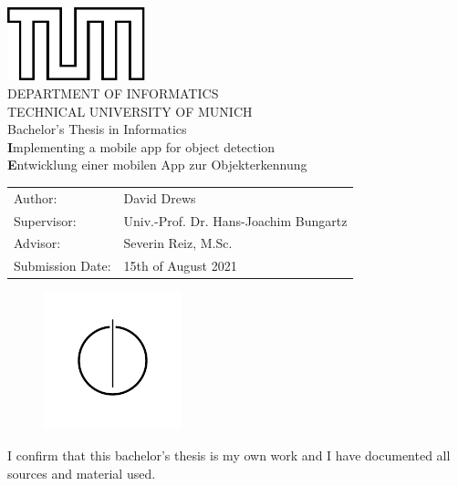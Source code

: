 \documentclass[
			   fontsize=11pt,
               paper=a4,
               bibliography=totoc,
               idxtotoc,
               headsepline,
               footsepline,
               footinclude=false,
               BCOR=12mm,
               DIV=13,
               openany,   %
               ]
               {scrbook}
\def\doctype{Bachelor's Thesis\xspace}
\def\studyProgram{Informatics}
\def\title{Implementing a mobile app for object detection}
\def\titleGer{Entwicklung einer mobilen App zur Objekterkennung}
\def\author{David Drews}
\def\supervisor{Univ.-Prof. Dr. Hans-Joachim Bungartz}
\def\advisor{Severin Reiz, M.Sc.}
\def\date{15th of August 2021}
\begin{document}
\def\bcorcor{0.15cm}
\addtolength{\hoffset}{\bcorcor}
\thispagestyle{empty}
\vspace{10mm}
\begin{center}
    \includegraphics[width=4cm]{templateStuff/tumlogo.pdf}\\[5mm]
	\huge DEPARTMENT OF INFORMATICS\\[5mm]
	\large TECHNICAL UNIVERSITY OF MUNICH\\[24mm]
	{\Large \doctype in \studyProgram}\\[20mm]
	{\LARGE\textbf \title}\\[10mm]
	{\LARGE\textbf \titleGer}\\[10mm]
	\begin{tabular}{ll}
		\Large Author:      	& \Large \author \\[2mm]
		\Large Supervisor:  	& \Large \supervisor\\[2mm]
		\Large Advisor:			& \Large \advisor\\[2mm]
		\Large Submission Date:       		& \Large \date
	\end{tabular}
	\vspace{-1mm}
	\begin{figure}[h!]
		\centering
		\includegraphics[width=4cm]{templateStuff/informat.pdf}
	\end{figure}
\end{center}

\addtolength{\hoffset}{\bcorcor}
\newpage


\cleardoubleemptypage

\thispagestyle{empty}
\vspace*{0.7\textheight}
\noindent
I confirm that this \MakeLowercase{\doctype} is my own work and I have documented all sources and material used.\\
\end{document}
